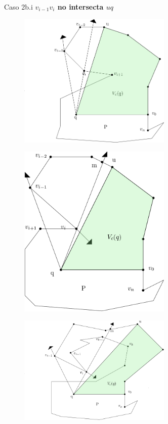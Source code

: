 \documentclass[aspectratio=169,xcolor=dvipsnames, t]{beamer}
\begin{document}
\begin{frame}{Caso 2b.i}
    \textbf{$v_{i-1}v_{i}$ no intersecta $uq$}\\ 
    \begin{figure}
            \centering
            \includegraphics[width=0.65\textwidth]{imagenes/Caso2.5b.png}
    \end{figure}
    \begin{figure}
            \centering
            \includegraphics[width=0.65\textwidth]{imagenes/Caso2.6a.png}
    \end{figure}
    \begin{figure}
            \centering
            \includegraphics[width=0.65\textwidth]{imagenes/Caso2.6b.png}
    \end{figure}
\end{frame}
\end{document}
